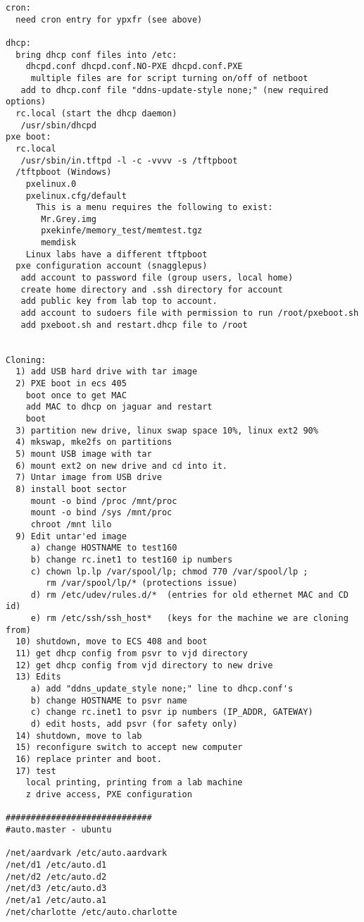 \begin{verbatim}
cron:
  need cron entry for ypxfr (see above)

dhcp:
  bring dhcp conf files into /etc:
    dhcpd.conf dhcpd.conf.NO-PXE dhcpd.conf.PXE
     multiple files are for script turning on/off of netboot
   add to dhcp.conf file "ddns-update-style none;" (new required options)
  rc.local (start the dhcp daemon)
   /usr/sbin/dhcpd
pxe boot:
  rc.local
   /usr/sbin/in.tftpd -l -c -vvvv -s /tftpboot
  /tftpboot (Windows)
    pxelinux.0
    pxelinux.cfg/default
      This is a menu requires the following to exist:
       Mr.Grey.img
       pxekinfe/memory_test/memtest.tgz
       memdisk
    Linux labs have a different tftpboot
  pxe configuration account (snagglepus)
   add account to password file (group users, local home)
   create home directory and .ssh directory for account
   add public key from lab top to account.
   add account to sudoers file with permission to run /root/pxeboot.sh
   add pxeboot.sh and restart.dhcp file to /root


Cloning:
  1) add USB hard drive with tar image
  2) PXE boot in ecs 405 
    boot once to get MAC
    add MAC to dhcp on jaguar and restart
    boot
  3) partition new drive, linux swap space 10%, linux ext2 90%
  4) mkswap, mke2fs on partitions
  5) mount USB image with tar
  6) mount ext2 on new drive and cd into it.
  7) Untar image from USB drive
  8) install boot sector
     mount -o bind /proc /mnt/proc
     mount -o bind /sys /mnt/proc
     chroot /mnt lilo
  9) Edit untar'ed image
     a) change HOSTNAME to test160
     b) change rc.inet1 to test160 ip numbers
     c) chown lp.lp /var/spool/lp; chmod 770 /var/spool/lp ;
        rm /var/spool/lp/* (protections issue)
     d) rm /etc/udev/rules.d/*  (entries for old ethernet MAC and CD id)
     e) rm /etc/ssh/ssh_host*   (keys for the machine we are cloning from)
  10) shutdown, move to ECS 408 and boot
  11) get dhcp config from psvr to vjd directory
  12) get dhcp config from vjd directory to new drive
  13) Edits
     a) add "ddns_update_style none;" line to dhcp.conf's
     b) change HOSTNAME to psvr name
     c) change rc.inet1 to psvr ip numbers (IP_ADDR, GATEWAY)
     d) edit hosts, add psvr (for safety only)
  14) shutdown, move to lab
  15) reconfigure switch to accept new computer
  16) replace printer and boot.
  17) test
    local printing, printing from a lab machine
    z drive access, PXE configuration

#############################
#auto.master - ubuntu

/net/aardvark /etc/auto.aardvark
/net/d1 /etc/auto.d1
/net/d2 /etc/auto.d2
/net/d3 /etc/auto.d3
/net/a1 /etc/auto.a1
/net/charlotte /etc/auto.charlotte


\end{verbatim}
